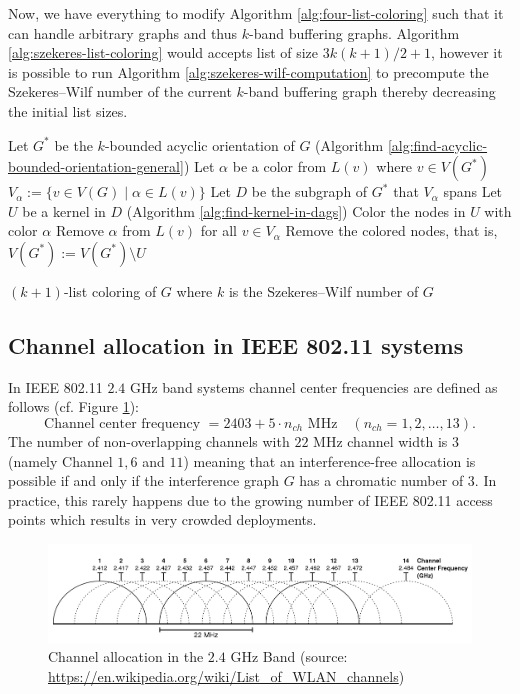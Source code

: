 \documentclass[a4paper, 12pt]{article}
\begin{document}
Now, we have everything to modify Algorithm \ref{alg:four-list-coloring} such that it can handle arbitrary graphs and thus $k$-band buffering graphs. Algorithm \ref{alg:szekeres-list-coloring} would accepts list of size $3k(k+1)/2+1$, however it is possible to run Algorithm \ref{alg:szekeres-wilf-computation} to precompute the Szekeres\---Wilf number of the current $k$-band buffering graph thereby decreasing the initial list sizes.

\begin{algorithm}\label{alg:szekeres-list-coloring}
  Let $G^*$ be the $k$-bounded acyclic orientation of $G$  (Algorithm \ref{alg:find-acyclic-bounded-orientation-general})\;
   {
  	Let $\alpha$ be a color from $L(v)$ where $v \in V(G^*)$\;
  	$V_\alpha := \lbrace v \in V(G) \mid \alpha \in L(v) \rbrace$\;
  	Let $D$ be the subgraph of $G^*$ that $V_\alpha$ spans\;
  	Let $U$ be a kernel in $D$ (Algorithm \ref{alg:find-kernel-in-dags})\;
  	Color the nodes in $U$ with color $\alpha$\;
  	Remove $\alpha$ from $L(v)$ for all $v \in V_\alpha$\;
  	Remove the colored nodes, that is, $V(G^*) := V(G^*) \setminus U$\;
  }
 \caption{$(k+1)$-list coloring of $G$ where $k$ is the Szekeres\---Wilf number of $G$}
\end{algorithm}

\subsection{Channel allocation in IEEE 802.11 systems}
In IEEE 802.11 $2.4$ GHz band systems channel center frequencies are defined as follows \cite{ieee80211} (cf. Figure \ref{fig:channel-allocation}):
$$\text{Channel center frequency } = 2403 + 5\cdot n_{ch} \text{ MHz} \quad (n_{ch} = 1,2,\ldots, 13).$$
The number of non-overlapping channels with $22$ MHz channel width is $3$ (namely Channel $1, 6$ and $11$) meaning that an interference-free allocation is possible if and only if the interference graph $G$ has a chromatic number of $3$. In practice, this rarely happens due to the growing number of IEEE 802.11 access points which results in very crowded deployments.
\begin{figure}[!h]
\centering
\includegraphics[scale=0.3]{figures/wifi-freq.png}
\caption{Channel allocation in the $2.4$ GHz Band (source: \url{https://en.wikipedia.org/wiki/List_of_WLAN_channels})}\label{fig:channel-allocation}
\end{figure}
\end{document}
